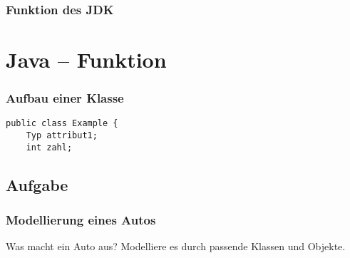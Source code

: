 \documentclass{beamer}
\begin{document}
\begin{frame}
\frametitle{Funktion des JDK}
\end{frame}

\section{Java -- Funktion}
\begin{frame}[fragile]
\frametitle{Aufbau einer Klasse}
\begin{verbatim}
public class Example {
    Typ attribut1;
    int zahl;

\end{verbatim}
\end{frame}

\subsection{Aufgabe}
\begin{frame}
\frametitle{Modellierung eines Autos}
Was macht ein Auto aus? Modelliere es durch passende Klassen und Objekte.
\end{frame}
\end{document}
